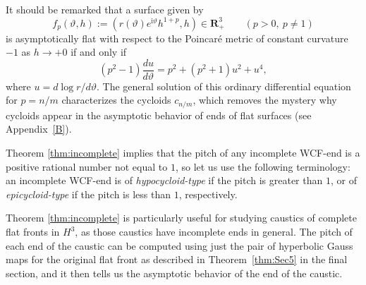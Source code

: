 \documentclass[a4paper]{amsart}
\theoremstyle{plain}
\theoremstyle{remark}
\numberwithin{equation}{section}
\begin{document}
It should be remarked that a surface given by
\[
   f_p(\vartheta,h):=(r(\vartheta)e^{{\mathrm{i}} \vartheta}h^{1+p},h)\in {\boldsymbol{R}}^3_+
   \qquad (p>0,~ p\ne 1)
\]
is asymptotically flat with respect to the Poincar\'e
metric of constant curvature $-1$ as $h\to +0$ if and only if
\[
   (p^2-1)\frac{du}{d \vartheta}= p^2+ (p^2 + 1)u^2+u^4,
\]
where $u= d \log r/d \vartheta$.
The general solution of this ordinary differential equation 
for $p=n/m$ characterizes the cycloids $c_{n/m}$, 
which removes the mystery why cycloids appear in the asymptotic
behavior of ends of flat surfaces (see Appendix~\ref{B}).

Theorem \ref{thm:incomplete} implies that the pitch of any incomplete
WCF-end is a positive rational number not equal to $1$, 
so let us use the following terminology: 
an incomplete WCF-end is of {\it hypocycloid-type\/} 
if the pitch is greater than $1$, or of {\it epicycloid-type\/}
if the pitch is less than $1$, respectively.

Theorem \ref{thm:incomplete} is particularly useful for studying
caustics of complete flat fronts in $H^3$, as those caustics have
incomplete ends in general.
The pitch of each end of the caustic can be computed using 
just the pair of hyperbolic Gauss maps for the original
flat front as described in Theorem~\ref{thm:Sec5} in the final section, 
and it then tells us the asymptotic behavior of the end of the caustic.
\end{document}
